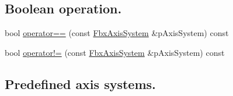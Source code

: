 \subsection*{Boolean operation.}
\begin{DoxyCompactItemize}
\item 
bool \hyperlink{class_fbx_axis_system_a36933159c0730e52b918f9b52cb2ecc1}{operator==} (const \hyperlink{class_fbx_axis_system}{Fbx\+Axis\+System} \&p\+Axis\+System) const
\item 
bool \hyperlink{class_fbx_axis_system_adf5cf05010b87ddde4bb158e274892b4}{operator!=} (const \hyperlink{class_fbx_axis_system}{Fbx\+Axis\+System} \&p\+Axis\+System) const
\end{DoxyCompactItemize}
\subsection*{Predefined axis systems.}
\label{_amgrp8a063321b07f432f44f56214112969d8}%
